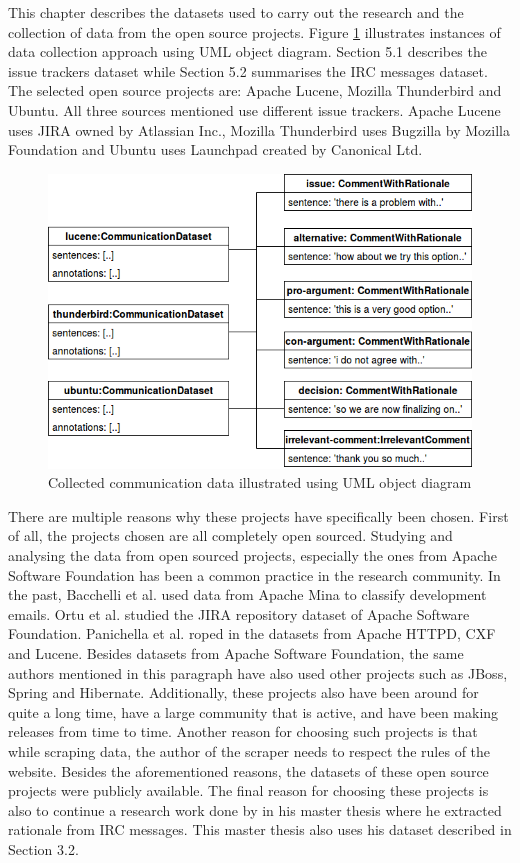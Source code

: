 \documentclass[a4paper,12pt,twoside]{report}
\begin{document}
This chapter describes the datasets used to carry out the research and the collection of data from the open source  projects. Figure \ref{fig:dataObject} illustrates instances of data collection approach using UML object diagram. Section 5.1 describes the issue trackers dataset while Section 5.2 summarises the \acs{IRC} messages dataset. The selected open source projects are: Apache Lucene, Mozilla Thunderbird and Ubuntu. All three sources mentioned use different issue trackers. Apache Lucene uses JIRA owned by Atlassian Inc., Mozilla Thunderbird uses Bugzilla by Mozilla Foundation and Ubuntu uses Launchpad created by Canonical Ltd. 
\begin{figure}[h] %
    \centering
    \includegraphics[width=12cm]{data-collection-object-diagram}
    \caption{Collected communication data illustrated using UML object diagram}
    \label{fig:dataObject}
\end{figure}
\noindent \newline
There are multiple reasons why these projects have specifically been chosen. First of all, the projects chosen are all completely open sourced. Studying and analysing the data from open sourced projects, especially the ones from Apache Software Foundation has been a common practice in the research community. In the past, Bacchelli et al.\cite{Bacchelli2012} used data from Apache Mina to classify development emails. Ortu et al.\cite{Ortu2015} studied the JIRA repository dataset of Apache Software Foundation. Panichella et al. \cite{Panichella2014} roped in the datasets from Apache HTTPD, CXF and Lucene. Besides datasets from Apache Software Foundation, the same authors mentioned in this paragraph have also used other projects such as JBoss, Spring and Hibernate. Additionally, these projects also have been around for quite a long time, have a large community that is active, and have been making releases from time to time. Another reason for choosing such projects is that while scraping data, the author of the scraper needs to respect the rules of the website. Besides the aforementioned reasons, the datasets of these open source projects were publicly available. The final reason for choosing these projects is also to continue a research work done by \cite{Nonnenmacher2017} in his master thesis where he extracted rationale from \acs{IRC} messages. This master thesis also uses his dataset described in Section 3.2. 
\end{document}
